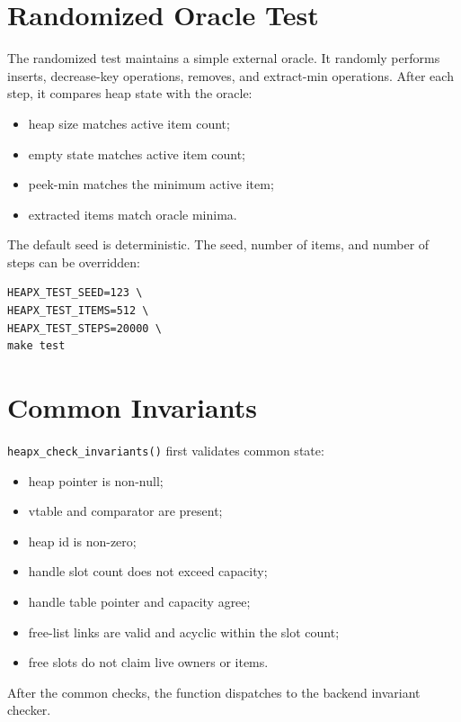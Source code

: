 \section{Randomized Oracle Test}

The randomized test maintains a simple external oracle.
It randomly performs inserts, decrease-key operations, removes, and extract-min operations.
After each step, it compares heap state with the oracle:

\begin{itemize}
    \item heap size matches active item count;
    \item empty state matches active item count;
    \item peek-min matches the minimum active item;
    \item extracted items match oracle minima.
\end{itemize}

The default seed is deterministic.
The seed, number of items, and number of steps can be overridden:

\begin{lstlisting}[style=shellstyle, caption={Longer randomized campaign.}]
HEAPX_TEST_SEED=123 \
HEAPX_TEST_ITEMS=512 \
HEAPX_TEST_STEPS=20000 \
make test
\end{lstlisting}

\section{Common Invariants}

\texttt{heapx\_check\_invariants()} first validates common state:

\begin{itemize}
    \item heap pointer is non-null;
    \item vtable and comparator are present;
    \item heap id is non-zero;
    \item handle slot count does not exceed capacity;
    \item handle table pointer and capacity agree;
    \item free-list links are valid and acyclic within the slot count;
    \item free slots do not claim live owners or items.
\end{itemize}

After the common checks, the function dispatches to the backend invariant checker.

